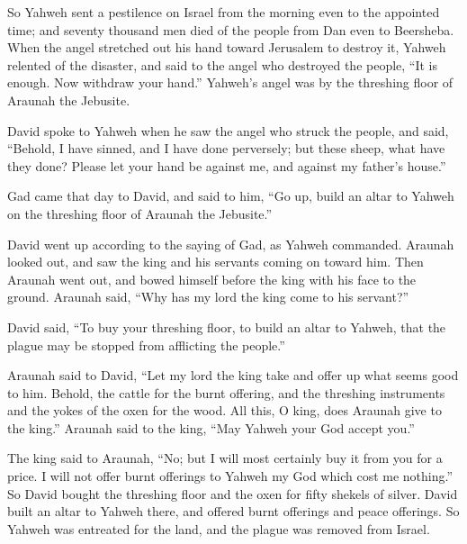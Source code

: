 {\par }{\PP {}So Yahweh sent a pestilence on Israel from the morning even to the appointed time; and seventy thousand men died of the people from Dan even to Beersheba.
When the angel stretched out his hand toward Jerusalem to destroy it, Yahweh relented of the disaster, and said to the angel who destroyed the people, “It is enough. Now withdraw your hand.” Yahweh’s angel was by the threshing floor of Araunah the Jebusite.
\par }{\PP {}David spoke to Yahweh when he saw the angel who struck the people, and said, “Behold, I have sinned, and I have done perversely; but these sheep, what have they done? Please let your hand be against me, and against my father’s house.”
\par }{\PP {}Gad came that day to David, and said to him, “Go up, build an altar to Yahweh on the threshing floor of Araunah the Jebusite.”
\par }{\PP {}David went up according to the saying of Gad, as Yahweh commanded.
Araunah looked out, and saw the king and his servants coming on toward him. Then Araunah went out, and bowed himself before the king with his face to the ground.
Araunah said, “Why has my lord the king come to his servant?”
\par }{\PP David said, “To buy your threshing floor, to build an altar to Yahweh, that the plague may be stopped from afflicting the people.”
\par }{\PP {}Araunah said to David, “Let my lord the king take and offer up what seems good to him. Behold, the cattle for the burnt offering, and the threshing instruments and the yokes of the oxen for the wood.
All this, O king, does Araunah give to the king.” Araunah said to the king, “May Yahweh your God accept you.”
\par }{\PP {}The king said to Araunah, “No; but I will most certainly buy it from you for a price. I will not offer burnt offerings to Yahweh my God which cost me nothing.” So David bought the threshing floor and the oxen for fifty shekels of silver.
David built an altar to Yahweh there, and offered burnt offerings and peace offerings. So Yahweh was entreated for the land, and the plague was removed from Israel.
\par }
